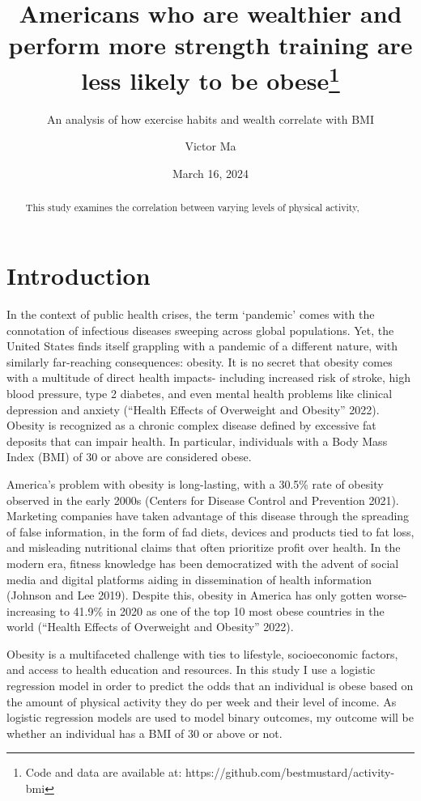 \documentclass[
  letterpaper,
  DIV=11,
  numbers=noendperiod]{scrartcl}
\title{Americans who are wealthier and perform more strength training
are less likely to be obese\thanks{Code and data are available at:
https://github.com/bestmustard/activity-bmi}}
\subtitle{An analysis of how exercise habits and wealth correlate with
BMI}
\author{Victor Ma}
\date{March 16, 2024}
\begin{document}
\maketitle
\begin{abstract}
This study examines the correlation between varying levels of physical
activity,
\end{abstract}
\ifdefined\Shaded\renewenvironment{Shaded}{\begin{tcolorbox}[breakable, interior hidden, boxrule=0pt, frame hidden, sharp corners, enhanced, borderline west={3pt}{0pt}{shadecolor}]}{\end{tcolorbox}}\fi

\hypertarget{introduction}{%
\section{Introduction}\label{introduction}}

In the context of public health crises, the term `pandemic' comes with
the connotation of infectious diseases sweeping across global
populations. Yet, the United States finds itself grappling with a
pandemic of a different nature, with similarly far-reaching
consequences: obesity. It is no secret that obesity comes with a
multitude of direct health impacts- including increased risk of stroke,
high blood pressure, type 2 diabetes, and even mental health problems
like clinical depression and anxiety ({``Health Effects of Overweight
and Obesity''} 2022). Obesity is recognized as a chronic complex disease
defined by excessive fat deposits that can impair health. In particular,
individuals with a Body Mass Index (BMI) of 30 or above are considered
obese.

America's problem with obesity is long-lasting, with a 30.5\% rate of
obesity observed in the early 2000s (Centers for Disease Control and
Prevention 2021). Marketing companies have taken advantage of this
disease through the spreading of false information, in the form of fad
diets, devices and products tied to fat loss, and misleading nutritional
claims that often prioritize profit over health. In the modern era,
fitness knowledge has been democratized with the advent of social media
and digital platforms aiding in dissemination of health information
(Johnson and Lee 2019). Despite this, obesity in America has only gotten
worse- increasing to 41.9\% in 2020 as one of the top 10 most obese
countries in the world ({``Health Effects of Overweight and Obesity''}
2022).

Obesity is a multifaceted challenge with ties to lifestyle,
socioeconomic factors, and access to health education and resources. In
this study I use a logistic regression model in order to predict the
odds that an individual is obese based on the amount of physical
activity they do per week and their level of income. As logistic
regression models are used to model binary outcomes, my outcome will be
whether an individual has a BMI of 30 or above or not.
\end{document}
